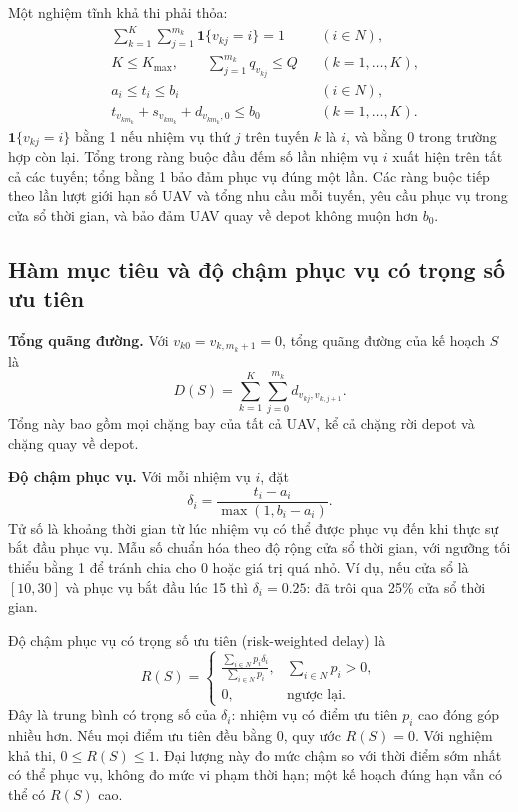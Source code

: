 \documentclass[11pt,a4paper]{article}
\begin{document}
Một nghiệm tĩnh khả thi phải thỏa:
\begin{align}
 &\sum_{k=1}^{K}\sum_{j=1}^{m_k}\mathbf{1}\{v_{kj}=i\}=1 && (i\in N),\\
 &K\le K_{\max},\qquad \sum_{j=1}^{m_k}q_{v_{kj}}\le Q && (k=1,\ldots,K),\\
 &a_i\le t_i\le b_i && (i\in N),\\
 &t_{v_{km_k}}+s_{v_{km_k}}+d_{v_{km_k},0}\le b_0 && (k=1,\ldots,K).
\end{align}
$\mathbf{1}\{v_{kj}=i\}$ bằng 1 nếu nhiệm vụ thứ $j$ trên tuyến $k$ là $i$, và bằng 0 trong trường hợp còn lại. Tổng trong ràng buộc đầu đếm số lần nhiệm vụ $i$ xuất hiện trên tất cả các tuyến; tổng bằng 1 bảo đảm phục vụ đúng một lần. Các ràng buộc tiếp theo lần lượt giới hạn số UAV và tổng nhu cầu mỗi tuyến, yêu cầu phục vụ trong cửa sổ thời gian, và bảo đảm UAV quay về depot không muộn hơn $b_0$.

\subsection{Hàm mục tiêu và độ chậm phục vụ có trọng số ưu tiên}
\textbf{Tổng quãng đường.} Với $v_{k0}=v_{k,m_k+1}=0$, tổng quãng đường của kế hoạch $S$ là
\begin{equation}
 D(S)=\sum_{k=1}^{K}\sum_{j=0}^{m_k}d_{v_{kj},v_{k,j+1}}.
\end{equation}
Tổng này bao gồm mọi chặng bay của tất cả UAV, kể cả chặng rời depot và chặng quay về depot.

\textbf{Độ chậm phục vụ.} Với mỗi nhiệm vụ $i$, đặt
\begin{equation}
 \delta_i=\frac{t_i-a_i}{\max(1,b_i-a_i)}.
\end{equation}
Tử số là khoảng thời gian từ lúc nhiệm vụ có thể được phục vụ đến khi thực sự bắt đầu phục vụ. Mẫu số chuẩn hóa theo độ rộng cửa sổ thời gian, với ngưỡng tối thiểu bằng 1 để tránh chia cho 0 hoặc giá trị quá nhỏ. Ví dụ, nếu cửa sổ là $[10,30]$ và phục vụ bắt đầu lúc 15 thì $\delta_i=0.25$: đã trôi qua 25\% cửa sổ thời gian.

Độ chậm phục vụ có trọng số ưu tiên (risk-weighted delay) là
\begin{equation}
 R(S)=\begin{cases}
 \displaystyle\frac{\sum_{i\in N}p_i\delta_i}{\sum_{i\in N}p_i},&\sum_{i\in N}p_i>0,\\
 0,&\text{ngược lại}.
 \end{cases}
\end{equation}
Đây là trung bình có trọng số của $\delta_i$: nhiệm vụ có điểm ưu tiên $p_i$ cao đóng góp nhiều hơn. Nếu mọi điểm ưu tiên đều bằng 0, quy ước $R(S)=0$. Với nghiệm khả thi, $0\le R(S)\le1$. Đại lượng này đo mức chậm so với thời điểm sớm nhất có thể phục vụ, không đo mức vi phạm thời hạn; một kế hoạch đúng hạn vẫn có thể có $R(S)$ cao.
\end{document}
